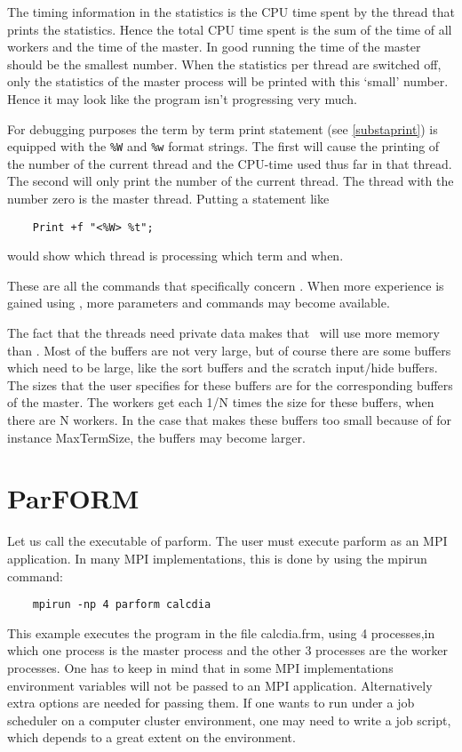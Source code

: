 The timing information in the statistics is the CPU time 
spent by the thread that prints the statistics. Hence the total CPU time 
spent is the sum of the time of all workers and the time of the master. In 
good running the time of the master should be the smallest number. When the 
statistics per thread are switched off, only the statistics of the master 
process will be printed with this `small' number. Hence it may look like 
the program isn't progressing very much.

For debugging purposes the term by term print statement (see 
\ref{substaprint}) is equipped with the \verb:%W: and \verb:%w: format 
strings. The first will cause the printing of the number of the current 
thread and the CPU-time used thus far in that thread. The second will only 
print the number of the current thread. The thread with the number zero is 
the master thread. Putting a statement like
\begin{verbatim}
    Print +f "<%W> %t";
\end{verbatim}
would show which thread is processing which term and when.

These are all the commands that specifically concern \TFORM\@. When more 
experience is gained using \TFORM, more parameters and commands may become 
available.

The fact that the threads need private data makes that \TFORM\ 
will use more memory than \FORM\@. Most of the buffers are not very large, but 
of course there are some buffers which need to be large, like the sort 
buffers and the scratch input\index{input}/hide\index{hide} buffers. The 
sizes that the user specifies for these buffers are for the corresponding 
buffers of the master. The workers get each 1/N times the size for these 
buffers, when there are N workers. In the case that makes these buffers too 
small because of for instance MaxTermSize, the buffers may become larger.


\section{ParFORM}
\label{parform}

Let us call the executable of \ParFORM{} parform.
The user must execute parform as an MPI application.
In many MPI implementations, this is done by using the mpirun
command:
\begin{verbatim}
    mpirun -np 4 parform calcdia
\end{verbatim}
This example executes the program in the file calcdia.frm, using 4 
processes,in which one process is the master process and the other 3 
processes are the worker processes.
One has to keep in mind that in some MPI implementations environment 
variables will not be passed to an MPI application. Alternatively extra 
options are needed for passing them.
If one wants to run \ParFORM{} under a job scheduler on a computer cluster
environment, one may need to write a job script, which depends to a great 
extent on the environment.

